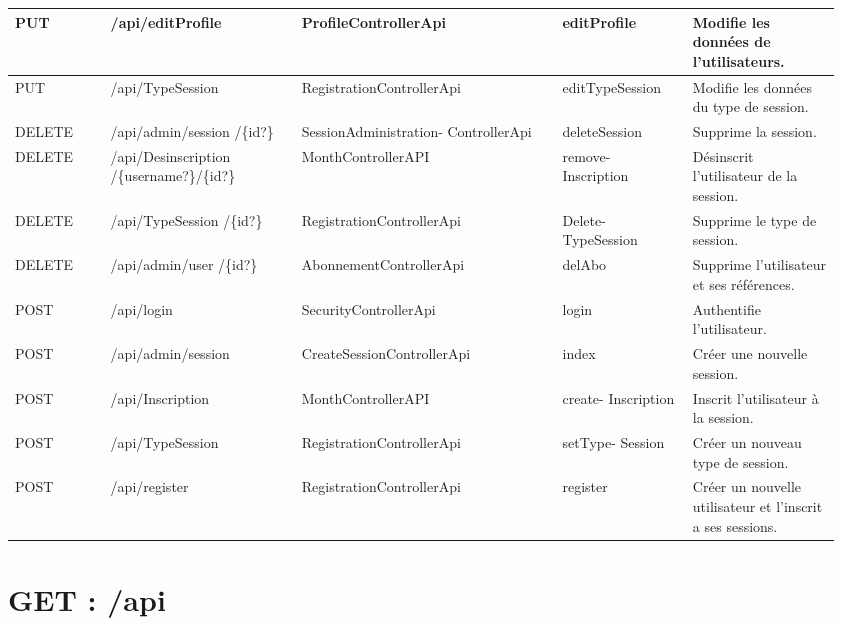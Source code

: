 		\newpage
			\begin{center}
				\begin{tabularx}{1.11\textwidth}{| T{0.11\linewidth} | S{0.22\linewidth} | S{0.3\linewidth} | S{0.151\linewidth} | S{0.175\linewidth} |}
					\hline
						PUT & /api/editProfile & ProfileControllerApi & editProfile & Modifie les données de l'utilisateurs. \\
					\hline
						PUT & /api/TypeSession & RegistrationControllerApi & editTypeSession & Modifie les données du type de session. \\
					\hline
					
					\hline
					
					\hline
						DELETE & /api/admin/session /\{id?\} & SessionAdministration- ControllerApi & deleteSession & Supprime la session. \\
					\hline
						DELETE & /api/Desinscription /\{username?\}/\{id?\} & MonthControllerAPI & remove- Inscription & Désinscrit l'utilisateur de la session. \\
					\hline
						DELETE & /api/TypeSession /\{id?\} & RegistrationControllerApi & Delete- TypeSession & Supprime le type de session. \\
					\hline
						DELETE & /api/admin/user /\{id?\} & AbonnementControllerApi & delAbo & Supprime l'utilisateur et ses références. \\
					\hline
			
					\hline
					
					\hline
						POST & /api/login & SecurityControllerApi & login & Authentifie l'utilisateur. \\
					\hline
						POST & /api/admin/session & CreateSessionControllerApi & index & Créer une nouvelle session. \\
					\hline
						POST & /api/Inscription & MonthControllerAPI & create- Inscription & Inscrit l'utilisateur à la session. \\
					\hline
						POST & /api/TypeSession & RegistrationControllerApi & setType- Session & Créer un nouveau type de session. \\
					\hline
						POST & /api/register & RegistrationControllerApi & register & Créer un nouvelle utilisateur et l'inscrit a ses sessions. \\
					\hline
				\end{tabularx}
			\end{center}


\newpage
\section{GET : /api}
	

